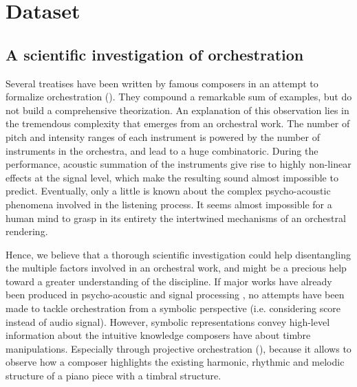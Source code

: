 \documentclass[twoside,twocolumn]{article}
\begin{document}
\section{Dataset}
\subsection{A scientific investigation of orchestration}
Several treatises have been written by famous composers in an attempt to formalize orchestration (\cite{koechli_orch,piston-orch,Rimsky-Korsakov:1873aa}).
They compound a remarkable sum of examples, but do not build a comprehensive theorization.
An explanation of this observation lies in the tremendous complexity that emerges from an orchestral work. The number of pitch and intensity ranges of each instrument is powered by the number of instruments in the orchestra, and lead to a huge combinatoric. During the performance, acoustic summation of the instruments give rise to highly non-linear effects at the signal level, which make the resulting sound almost impossible to predict. Eventually, only a little is known about the complex psycho-acoustic phenomena involved in the listening process.
It seems almost impossible for a human mind to grasp in its entirety the intertwined mechanisms of an orchestral rendering.

Hence, we believe that a thorough scientific investigation could help disentangling the multiple factors involved in an orchestral work, and might be a precious help toward a greater understanding of the discipline.
If major works have already been produced in psycho-acoustic \cite{mcadams2013timbre,pressnitzer2000perception,tardieu2012perception} and signal processing \cite{peeters2011timbre}, no attempts have been made to tackle orchestration from a symbolic perspective (i.e. considering score instead of audio signal).
However, symbolic representations convey high-level information about the intuitive knowledge composers have about timbre manipulations. 
Especially through projective orchestration (), because it allows to observe how a composer highlights the existing harmonic, rhythmic and melodic structure of a piano piece with a timbral structure.
\end{document}

